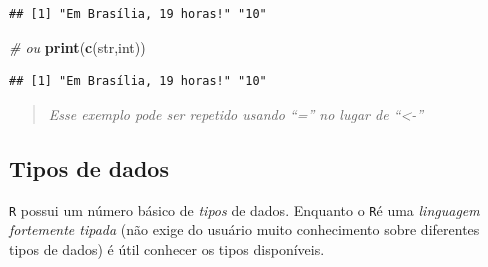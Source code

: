 \documentclass[
]{book}
\newenvironment{Shaded}{\begin{snugshade}}{\end{snugshade}}
\newcommand{\CommentTok}[1]{\textcolor[rgb]{0.56,0.35,0.01}{\textit{#1}}}
\newcommand{\KeywordTok}[1]{\textcolor[rgb]{0.13,0.29,0.53}{\textbf{#1}}}
\newcommand{\NormalTok}[1]{#1}
\theoremstyle{definition}
\theoremstyle{definition}
\theoremstyle{definition}
\theoremstyle{remark}
\begin{document}
\begin{verbatim}
## [1] "Em Brasília, 19 horas!" "10"
\end{verbatim}

\begin{Shaded}
\begin{Highlighting}[]
\CommentTok{# ou}
\KeywordTok{print}\NormalTok{(}\KeywordTok{c}\NormalTok{(str,int))}
\end{Highlighting}
\end{Shaded}

\begin{verbatim}
## [1] "Em Brasília, 19 horas!" "10"
\end{verbatim}

\begin{quote}
\emph{Esse exemplo pode ser repetido usando ``='' no lugar de ``\textless-''}
\end{quote}

\hypertarget{tipos-de-dados}{%
\subsection{Tipos de dados}\label{tipos-de-dados}}

\texttt{R} possui um número básico de \emph{tipos} de dados. Enquanto o \texttt{R}é uma \emph{linguagem fortemente tipada} (não exige do usuário muito conhecimento sobre diferentes tipos de dados) é útil conhecer os tipos disponíveis.
\end{document}
